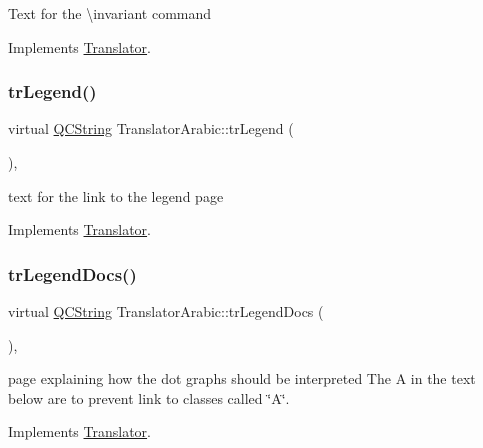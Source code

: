 Text for the \textbackslash{}invariant command 

Implements \mbox{\hyperlink{class_translator}{Translator}}.

\mbox{\label{class_translator_arabic_abb8560f05098200f708e49b7f379085b}} 
\subsubsection{\texorpdfstring{trLegend()}{trLegend()}}
{\footnotesize\ttfamily virtual \mbox{\hyperlink{class_q_c_string}{Q\+C\+String}} Translator\+Arabic\+::tr\+Legend (\begin{DoxyParamCaption}{ }\end{DoxyParamCaption})\hspace{0.3cm}{\ttfamily [inline]}, {\ttfamily [virtual]}}

text for the link to the legend page 

Implements \mbox{\hyperlink{class_translator}{Translator}}.

\mbox{\label{class_translator_arabic_a8e0d765f0f36ce753781268166668e5e}} 
\subsubsection{\texorpdfstring{trLegendDocs()}{trLegendDocs()}}
{\footnotesize\ttfamily virtual \mbox{\hyperlink{class_q_c_string}{Q\+C\+String}} Translator\+Arabic\+::tr\+Legend\+Docs (\begin{DoxyParamCaption}{ }\end{DoxyParamCaption})\hspace{0.3cm}{\ttfamily [inline]}, {\ttfamily [virtual]}}

page explaining how the dot graph\textquotesingle{}s should be interpreted The A in the text below are to prevent link to classes called \char`\"{}\+A\char`\"{}. 

Implements \mbox{\hyperlink{class_translator}{Translator}}.

\mbox{\label{class_translator_arabic_a4bbd8643ed28fa15c86fbc8cd38f22f5}} 
